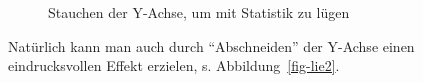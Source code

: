 \documentclass[
  letterpaper,
]{scrbook}
\theoremstyle{definition}
\theoremstyle{definition}
\theoremstyle{definition}
\theoremstyle{remark}
\begin{document}
\begin{figure}
\begin{minipage}{0.50\linewidth}
{}


\end{minipage}%
%
\begin{minipage}{0.50\linewidth}



\end{minipage}%

\caption{\label{fig-lie1}Stauchen der Y-Achse, um mit Statistik zu
lügen}

\end{figure}%

Natürlich kann man auch durch ``Abschneiden'' der Y-Achse einen
eindrucksvollen Effekt erzielen, s. Abbildung~\ref{fig-lie2}.
\end{document}
